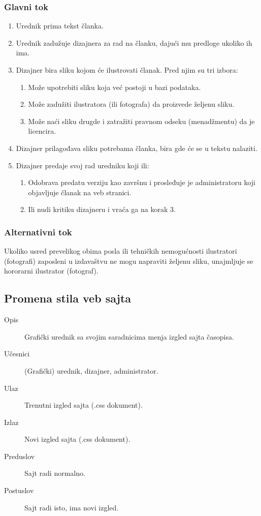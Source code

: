 \subsubsection{Glavni tok}
\begin{enumerate} 
\item Urednik prima tekst članka.
\item Urednik zadužuje dizajnera za rad na članku, dajući mu predloge ukoliko ih ima.
\item Dizajner bira sliku kojom će ilustrovati članak. Pred njim su tri izbora:
\begin{enumerate}
\item Može upotrebiti sliku koja već postoji u bazi podataka.
\item Može zadužiti ilustratora (ili fotografa) da proizvede željenu sliku.
\item Može naći sliku drugde i zatražiti pravnom odseku (menadžmentu) da je licencira.
\end{enumerate}
\item Dizajner prilagođava sliku potrebama članka, bira gde će se u tekstu nalaziti.
\item Dizajner predaje svoj rad uredniku koji ili:
\begin{enumerate}
\item Odobrava predatu verziju kao završnu i prosleđuje je administratoru koji objavljuje članak na veb stranici.
\item Ili nudi kritiku dizajneru i vraća ga na korak 3.
\end{enumerate}
\end{enumerate}
\subsubsection{Alternativni tok}
Ukoliko usred prevelikog obima posla ili tehničkih nemogućnosti ilustratori (fotografi) zaposleni u izdavaštvu ne mogu napraviti željenu sliku, unajmljuje se hororarni ilustrator (fotograf).

\subsection{Promena stila veb sajta}
\begin{description}
\item [Opis] Grafički urednik sa svojim saradnicima menja izgled sajta časopisa.
\item [Učesnici] (Grafički) urednik, dizajner, administrator.
\item [Ulaz] Trenutni izgled sajta (.css dokument).
\item [Izlaz] Novi izgled sajta (.css dokument).
\item [Preduslov] Sajt radi normalno.
\item [Postuslov] Sajt radi isto, ima novi izgled.
\end{description}
